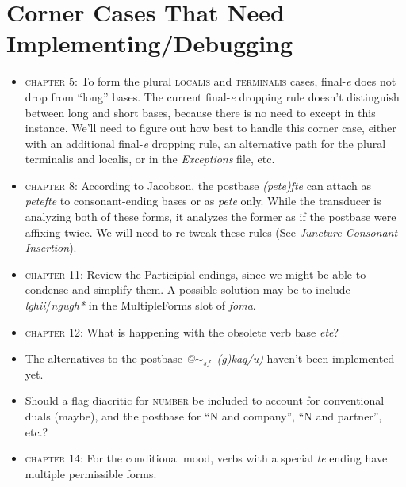 \documentclass{article}
\begin{document}

\section{Corner Cases That Need Implementing/Debugging}

\begin{itemize}
\renewcommand\labelitemi{$\cdot$}

\item \textsc{chapter 5}: To form the plural \textsc{localis} and \textsc{terminalis} cases, final-\textit{e} does not drop from ``long'' bases.
%
The current final-\textit{e} dropping rule doesn't distinguish between long and short bases, because there is no need to except in this instance.
%
We'll need to figure out how best to handle this corner case, either with an additional final-\textit{e} dropping rule, an alternative path for the plural terminalis and localis, or in the \textit{Exceptions} file, etc.

\item \textsc{chapter 8}: According to Jacobson, the postbase \textit{(pete)fte} can attach as \textit{petefte} to consonant-ending bases or as \textit{pete} only.
%
While the transducer is analyzing both of these forms, it analyzes the former as if the postbase were affixing twice.
%
We will need to re-tweak these rules (See \textit{Juncture Consonant Insertion}).

\item \textsc{chapter 11}: Review the Participial endings, since we might be able to condense and simplify them.
%
A possible solution may be to include \textit{--lghii}/\textit{ngugh*} in the MultipleForms slot of \textit{foma}.

\item \textsc{chapter 12}: What is happening with the obsolete verb base \textit{ete}?

\item The alternatives to the postbase \textit{@$\sim_{sf}$--(g)kaq/u)} haven't been implemented yet.

\item Should a flag diacritic for \textsc{number} be included to account for conventional duals (maybe), and the postbase for ``N and company'', ``N and partner'', etc.?

\item \textsc{chapter 14}: For the conditional mood, verbs with a special \textit{te} ending have multiple permissible forms.


\end{itemize}
\end{document}
